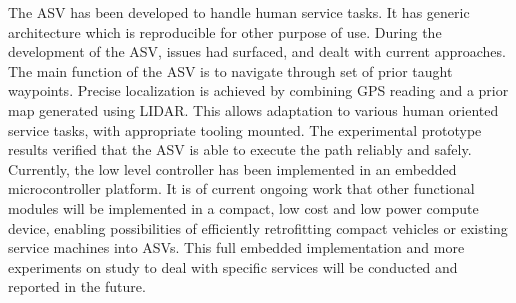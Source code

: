 \documentclass[10 pt,a4paper,conference]{IEEEtran}
\begin{document}
The ASV has been developed to handle human service tasks. It has generic
architecture which is reproducible for other purpose of use. During the
development of the ASV, issues had surfaced, and dealt with current
approaches. The main function of the ASV is to navigate through set of
prior taught waypoints. Precise localization is achieved by combining
GPS reading and a prior map generated using LIDAR. This allows
adaptation to various human oriented service tasks, with appropriate
tooling mounted. The experimental prototype results verified that the
ASV is able to execute the path reliably and safely. Currently, the low
level controller has been implemented in an embedded microcontroller
platform. It is of current ongoing work that other functional modules
will be implemented in a compact, low cost and low power compute device,
enabling possibilities of efficiently retrofitting compact vehicles or
existing service machines into ASVs. This full embedded implementation
and more experiments on study to deal with specific services will be
conducted and reported in the future.

\small

                                    \renewcommand\refname{References}
                        

    
\end{document}
